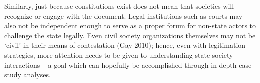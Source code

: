 \documentclass [11pt]{article}
\begin{document}
Similarly, just because constitutions exist does not mean that societies will recognize or engage with the document. Legal institutions such as courts may also not be independent enough to serve as a proper forum for non-state actors to challenge the state legally. Even civil society organizations themselves may not be `civil' in their means of contestation (Gay 2010); hence, even with legitimation strategies, more attention needs to be given to understanding state-society interactions -- a goal which can hopefully be accomplished through in-depth case study analyses.


















\end{document}
